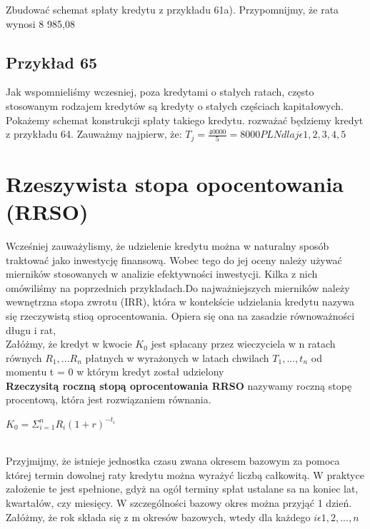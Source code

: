 \documentclass{article}
\begin{document}
Zbudować schemat spłaty kredytu z przykładu 61a). Przypomnijmy, że rata wynosi 8 985,08

\subsection{Przykład 65}

Jak wspomnieliśmy wczesniej, poza kredytami o stałych ratach, często stosowanym rodzajem kredytów są kredyty o stałych częściach kapitałowych. Pokażemy schemat konstrukcji spłaty takiego kredytu. rozważać będziemy kredyt z przykładu 64. Zauważmy najpierw, że: $ T_j = \frac{40000}{5} = 8000PLN dla j \epsilon {1,2,3,4,5} $

\section{Rzeszywista stopa opocentowania (RRSO)}

Wcześniej zauważylismy, że udzielenie kredytu można w naturalny sposób traktować jako inwestycję finansową. Wobec tego do jej oceny należy używać mierników stosowanych w analizie efektywności inwestycji. Kilka z nich omówiliśmy na poprzednich przykladach.Do najważniejszych  mierników należy wewnętrzna stopa zwrotu (IRR), która w kontekście udzielania kredytu nazywa się rzeczywistą stioą oprocentowania. Opiera się ona na zasadzie równoważności długu i rat,\\

Załóżmy, że kredyt w kwocie $ K_0 $ jest spłacany przez wieczyciela w n ratach równych $ R_1, ...R_n $ płatnych w wyrażonych w latach chwilach $T_1, ...,t_n $ od momentu t = 0 w którym kredyt został udzielony\\

\textbf{Rzeczysitą roczną stopą oprocentowania RRSO} nazywamy roczną stopę procentową, która jest rozwiązaniem równania.

\begin{center}
		$ K_0 = \Sigma ^n_{i=1} R_i(1 + r)^{-t_i} $
\end{center}\\

Przyjmijmy, że istnieje jednostka czasu zwana okresem bazowym za pomoca której termin dowolnej raty kredytu można wyrażyć liczbą całkowitą. W praktyce założenie te jest spełnione, gdyż na ogół terminy spłat ustalane sa na koniec lat, kwartałów, czy miesięcy. W szczególności bazowy okres można przyjąć 1 dzień. Załóżmy, że rok składa się z m okresów bazowych, wtedy dla każdego $ i \epsilon {1,2,...,n} $\\
\end{document}
